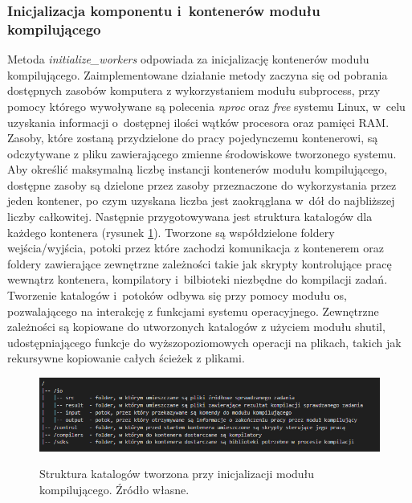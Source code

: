 \subsubsection{Inicjalizacja komponentu i~kontenerów modułu kompilującego}
Metoda \textit{initialize\_workers} odpowiada za inicjalizację kontenerów modułu kompilującego. Zaimplementowane działanie metody zaczyna się od pobrania dostępnych zasobów komputera z wykorzystaniem modułu subprocess\cite{pythonSubprocess}, przy pomocy którego wywoływane są polecenia \textit{nproc}\cite{linuxNproc} oraz \textit{free}\cite{linuxFree} systemu Linux, w~celu uzyskania informacji o~dostępnej ilości wątków procesora oraz pamięci RAM. Zasoby, które zostaną przydzielone do pracy pojedynczemu kontenerowi, są odczytywane z pliku zawierającego zmienne środowiskowe tworzonego systemu. Aby określić maksymalną liczbę instancji kontenerów modułu kompilującego, dostępne zasoby są dzielone przez zasoby przeznaczone do wykorzystania przez jeden kontener, po czym uzyskana liczba jest zaokrąglana w~dół do najbliższej liczby całkowitej. Następnie przygotowywana jest struktura katalogów dla każdego kontenera (rysunek \ref{fig:scheduler-directory-structure}). Tworzone są współdzielone foldery wejścia/wyjścia, potoki przez które zachodzi komunikacja z kontenerem oraz foldery zawierające zewnętrzne zależności takie jak skrypty kontrolujące pracę wewnątrz kontenera, kompilatory i~bilbioteki niezbędne do kompilacji zadań. Tworzenie katalogów i~potoków odbywa się przy pomocy modułu os\cite{pytohnOs}, pozwalającego na interakcję z funkcjami systemu operacyjnego. Zewnętrzne zależności są kopiowane do utworzonych katalogów z użyciem modułu shutil\cite{pythonShutil}, udostępniającego funkcje do wyższopoziomowych operacji na plikach, takich jak rekursywne kopiowanie całych ścieżek z plikami.
\begin{figure}[!ht]
	\begin{center}
		\resizebox{1\textwidth}{!} {
			\includegraphics{img/3/orkiestrator-kontenerow-struktura-katalogow.png}
		}
		\caption{Struktura katalogów tworzona przy inicjalizacji modułu kompilującego. Źródło własne.}
		\label{fig:scheduler-directory-structure}
	\end{center}
\end{figure}
